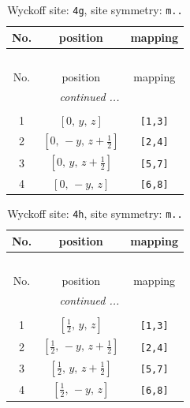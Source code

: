 \documentclass[fleqn,8pt]{jsarticle}
\begin{document}
\renewcommand{\arraystretch}{1.2}
\begin{longtable}{ccc}
\caption{Wyckoff site: {\tt 4g}, site symmetry: {\tt m..}}
 \\
 \hline \hline
No. & position & mapping \\ \hline \endfirsthead

\multicolumn{2}{l}{\tablename\ \thetable{}} \\
 \hline \hline
No. & position & mapping \\ \hline \endhead

 \hline \hline
\multicolumn{2}{r}{\footnotesize\it continued ...} \\ \endfoot

 \hline \hline
\multicolumn{2}{r}{} \\ \endlastfoot

1 & $\left[ 0,\, y,\, z \right]$ & {\tt [1,3]} \\ \hline
2 & $\left[ 0,\, - y,\, z + \frac{1}{2} \right]$ & {\tt [2,4]} \\ \hline
3 & $\left[ 0,\, y,\, z + \frac{1}{2} \right]$ & {\tt [5,7]} \\ \hline
4 & $\left[ 0,\, - y,\, z \right]$ & {\tt [6,8]} \\
\end{longtable}
\renewcommand{\arraystretch}{1.2}
\begin{longtable}{ccc}
\caption{Wyckoff site: {\tt 4h}, site symmetry: {\tt m..}}
 \\
 \hline \hline
No. & position & mapping \\ \hline \endfirsthead

\multicolumn{2}{l}{\tablename\ \thetable{}} \\
 \hline \hline
No. & position & mapping \\ \hline \endhead

 \hline \hline
\multicolumn{2}{r}{\footnotesize\it continued ...} \\ \endfoot

 \hline \hline
\multicolumn{2}{r}{} \\ \endlastfoot

1 & $\left[ \frac{1}{2},\, y,\, z \right]$ & {\tt [1,3]} \\ \hline
2 & $\left[ \frac{1}{2},\, - y,\, z + \frac{1}{2} \right]$ & {\tt [2,4]} \\ \hline
3 & $\left[ \frac{1}{2},\, y,\, z + \frac{1}{2} \right]$ & {\tt [5,7]} \\ \hline
4 & $\left[ \frac{1}{2},\, - y,\, z \right]$ & {\tt [6,8]} \\
\end{longtable}
\end{document}
